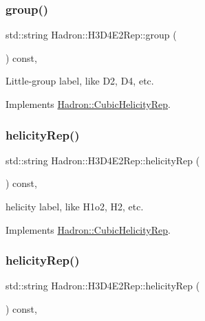 \subsubsection{\texorpdfstring{group()}{group()}\hspace{0.1cm}{\footnotesize\ttfamily [5/5]}}
{\footnotesize\ttfamily std\+::string Hadron\+::\+H3\+D4\+E2\+Rep\+::group (\begin{DoxyParamCaption}{ }\end{DoxyParamCaption}) const\hspace{0.3cm}{\ttfamily [inline]}, {\ttfamily [virtual]}}

Little-\/group label, like D2, D4, etc. 

Implements \mbox{\hyperlink{structHadron_1_1CubicHelicityRep_a101a7d76cd8ccdad0f272db44b766113}{Hadron\+::\+Cubic\+Helicity\+Rep}}.

\mbox{\label{structHadron_1_1H3D4E2Rep_a9b041630539536a249a5a6cae0fdb0d4}} 
\subsubsection{\texorpdfstring{helicityRep()}{helicityRep()}\hspace{0.1cm}{\footnotesize\ttfamily [1/3]}}
{\footnotesize\ttfamily std\+::string Hadron\+::\+H3\+D4\+E2\+Rep\+::helicity\+Rep (\begin{DoxyParamCaption}{ }\end{DoxyParamCaption}) const\hspace{0.3cm}{\ttfamily [inline]}, {\ttfamily [virtual]}}

helicity label, like H1o2, H2, etc. 

Implements \mbox{\hyperlink{structHadron_1_1CubicHelicityRep_af1096946b7470edf0a55451cc662f231}{Hadron\+::\+Cubic\+Helicity\+Rep}}.

\mbox{\label{structHadron_1_1H3D4E2Rep_a9b041630539536a249a5a6cae0fdb0d4}} 
\subsubsection{\texorpdfstring{helicityRep()}{helicityRep()}\hspace{0.1cm}{\footnotesize\ttfamily [2/3]}}
{\footnotesize\ttfamily std\+::string Hadron\+::\+H3\+D4\+E2\+Rep\+::helicity\+Rep (\begin{DoxyParamCaption}{ }\end{DoxyParamCaption}) const\hspace{0.3cm}{\ttfamily [inline]}, {\ttfamily [virtual]}}


